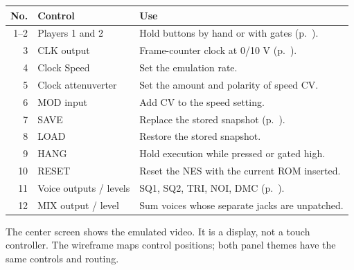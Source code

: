 \begin{center}
\resizebox{.94\textwidth}{!}{}
\end{center}
\begin{tabularx}{\textwidth}{@{}r l X@{}}
\toprule
\textbf{No.} & \textbf{Control} & \textbf{Use} \\
\midrule
1--2 & Players 1 and 2 & Hold buttons by hand or with gates (p.~\pageref{sec:controllers}). \\
3 & CLK output & Frame-counter clock at 0/10 V (p.~\pageref{sec:clock}). \\
4 & Clock Speed & Set the emulation rate. \\
5 & Clock attenuverter & Set the amount and polarity of speed CV. \\
6 & MOD input & Add CV to the speed setting. \\
7 & SAVE & Replace the stored snapshot (p.~\pageref{sec:state}). \\
8 & LOAD & Restore the stored snapshot. \\
9 & HANG & Hold execution while pressed or gated high. \\
10 & RESET & Reset the NES with the current ROM inserted. \\
11 & Voice outputs / levels & SQ1, SQ2, TRI, NOI, DMC (p.~\pageref{sec:audio}). \\
12 & MIX output / level & Sum voices whose separate jacks are unpatched. \\
\bottomrule
\end{tabularx}

The center screen shows the emulated video. It is a display, not a touch
controller. The wireframe maps control positions; both panel themes have
the same controls and routing.
